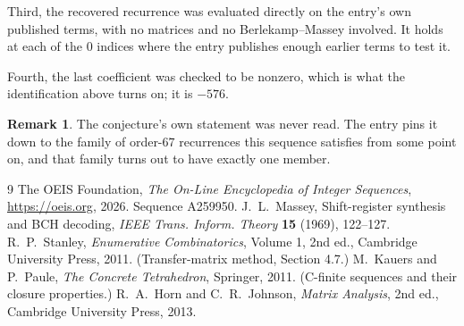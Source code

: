 \documentclass[11pt,a4paper]{article}
\theoremstyle{plain}
\theoremstyle{definition}
\newtheorem{remark}[theorem]{Remark}
\begin{document}
Third, the recovered recurrence was evaluated directly on the entry's own published terms, with
no matrices and no Berlekamp--Massey involved. It holds at each of the $0$ indices where
the entry publishes enough earlier terms to test it.

Fourth, the last coefficient was checked to be nonzero, which is what the identification above
turns on; it is $-576$.

\begin{remark}
The conjecture's own statement was never read. The entry pins it down to the family of
order-$67$ recurrences this sequence satisfies from some point on, and that family turns
out to have exactly one member.
\end{remark}

\begin{thebibliography}{9}
 The OEIS Foundation, \emph{The On-Line Encyclopedia of Integer
Sequences}, \url{https://oeis.org}, 2026. Sequence A259950.
 J.~L.~Massey, Shift-register synthesis and BCH decoding, \emph{IEEE
Trans. Inform. Theory} \textbf{15} (1969), 122--127.
 R.~P.~Stanley, \emph{Enumerative Combinatorics}, Volume 1, 2nd ed.,
Cambridge University Press, 2011. (Transfer-matrix method, Section 4.7.)
 M.~Kauers and P.~Paule, \emph{The Concrete Tetrahedron}, Springer, 2011.
(C-finite sequences and their closure properties.)
 R.~A.~Horn and C.~R.~Johnson, \emph{Matrix Analysis}, 2nd ed., Cambridge
University Press, 2013.
\end{thebibliography}
\end{document}
